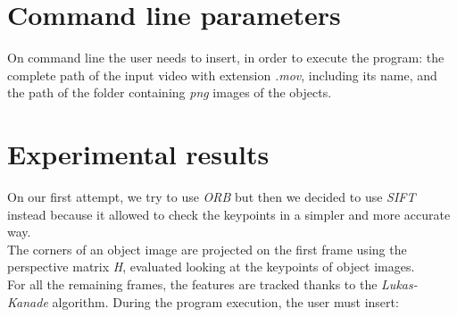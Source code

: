 \documentclass{article}
\begin{document}
\section{Command line parameters}
On command line the user needs to insert, in order to execute the program: the complete path of the input video with extension \textit{.mov}, including its name, and the path of the folder containing \textit{png} images of the objects.

\section{Experimental results}
On our first attempt, we try to use \textit{ORB} but then we decided to use \textit{SIFT} instead because it allowed to check the keypoints in a simpler and more accurate way.\\
The corners of an object image are projected on the first frame using the perspective matrix \textit{H}, evaluated looking at the keypoints of object images.\\
For all the remaining frames, the features are tracked thanks to the \textit{Lukas-Kanade} algorithm. During the program execution, the user must insert:
\end{document}
